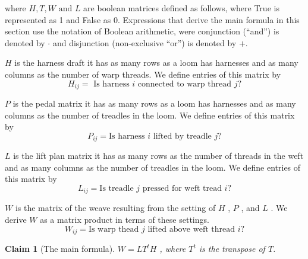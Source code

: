 \documentclass[10pt,]{article}
\theoremstyle{plain}
\newtheorem{claim}[theorem]{Claim}
\begin{document}
where \(H, T, W \textrm{ and } L\) are boolean matrices defined as follows, where True is represented as 1 and False as 0.  Expressions that derive the main formula in this section use the notation of Boolean arithmetic, were conjunction (``and'') is denoted by \(\cdot\) and disjunction (non-exclusive ``or'') is denoted by \(+\).%
\par
 \(H\)  is the harness draft it has as many rows as a loom has harnesses and as many columns as the number of warp threads. We define entries of this matrix by
\begin{equation*}H_{i j }=\textrm{ Is harness } i \textrm{ connected to  warp thread } j?\end{equation*}
%
\par
\(P\)  is the pedal matrix it has as many rows as a loom has harnesses and as many columns as the number of treadles in the loom. We define entries of this matrix by
\begin{equation*}P_{i j}= \textrm{Is harness } i \textrm{ lifted by treadle } j?\end{equation*}
%
\par
 \(L\)  is the lift plan matrix it has as many rows as the number of threads in the weft and as many columns as the number of treadles in the loom. We define entries of this matrix by
\begin{equation*}L_{i j}= \textrm{Is treadle } j \textrm{ pressed for weft tread } i?\end{equation*}
%
\par
 \(W\) is the matrix of the weave resulting  from the setting of  \(H\) ,  \(P\) , and  \(L\) . We derive  \(W\)  as a matrix
product in terms of these settings.
\begin{equation*}W_{i j}= \textrm{Is warp thead } j \textrm{ lifted above weft thread } i?\end{equation*}%
\begin{claim}[The main formula]\label{claim-1}
 \(W = L T^t H\) , where \(T^t\) is the transpose of \(T\).%
\end{claim}
\end{document}
